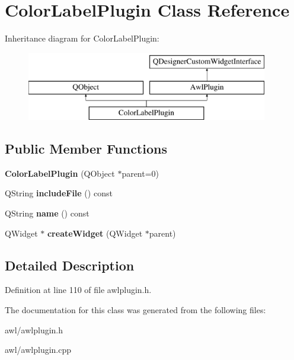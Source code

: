 \hypertarget{class_color_label_plugin}{}\section{Color\+Label\+Plugin Class Reference}
\label{class_color_label_plugin}
Inheritance diagram for Color\+Label\+Plugin\+:\begin{figure}[H]
\begin{center}
\leavevmode
\includegraphics[height=3.000000cm]{class_color_label_plugin}
\end{center}
\end{figure}
\subsection*{Public Member Functions}
\begin{DoxyCompactItemize}
\item 
\mbox{\label{class_color_label_plugin_a135cdb9f0f8c0355d375a0ccf674c3ae}} 
{\bfseries Color\+Label\+Plugin} (Q\+Object $\ast$parent=0)
\item 
\mbox{\label{class_color_label_plugin_a2ad5026e0ac5292abe88fa1b9cde9dc7}} 
Q\+String {\bfseries include\+File} () const
\item 
\mbox{\label{class_color_label_plugin_ae0e665edfbe1f84cdc0e7a3352a3bf89}} 
Q\+String {\bfseries name} () const
\item 
\mbox{\label{class_color_label_plugin_ac73dddfa1103a4e96f326668cd72a71f}} 
Q\+Widget $\ast$ {\bfseries create\+Widget} (Q\+Widget $\ast$parent)
\end{DoxyCompactItemize}


\subsection{Detailed Description}


Definition at line 110 of file awlplugin.\+h.



The documentation for this class was generated from the following files\+:\begin{DoxyCompactItemize}
\item 
awl/awlplugin.\+h\item 
awl/awlplugin.\+cpp\end{DoxyCompactItemize}

